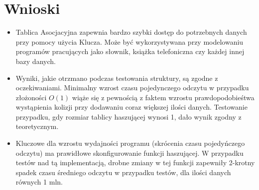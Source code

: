 \documentclass[12pt,a4paper,titlepage]{article}
\begin{document}
\section{Wnioski}
\begin{itemize}
\item Tablica Asocjacyjna zapewnia bardzo szybki dostęp do potrzebnych danych przy pomocy użycia Klucza.
Może być wykorzystywana przy modelowaniu programów pracujących jako słownik, książka telefoniczna czy każdej innej bazy danych.
\item Wyniki, jakie otrzmano podczas testowania struktury, są zgodne z oczekiwaniami.\newline
Minimalny wzrost czasu pojedynczego odczytu w przypadku złożoności $O(1)$ wiąże się z pewnością z faktem wzrostu prawdopodobieśtwa wystąpienia kolizji przy dodawaniu coraz większej ilości danych.
Testowanie przypadku, gdy rozmiar tablicy haszującej wynosi 1, dało wynik zgodny z teoretycznym.
\item Kluczowe dla wzrostu wydajności programu (skrócenia czasu pojedyńczego odczytu) ma prawidłowe skonfigurowanie funkcji haszującej.\newline
W przypadku testów nad tą implementacją, drobne zmiany w tej funkcji zapewniły 2-krotny spadek czasu średniego odczytu w przypadku testów, dla ilości danych równych 1 mln. 
\end{itemize}
\end{document}
